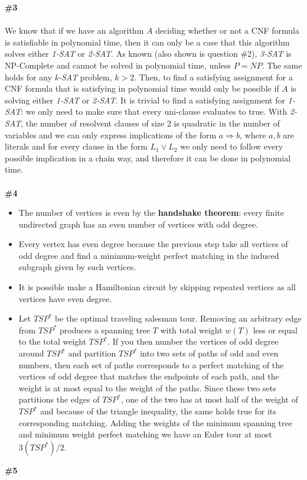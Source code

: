 \documentclass{article}
\begin{document}
\textbf{\#3}
\\
\\
We know that if we have an algorithm $A$ deciding whether or not a CNF formula is satisfiable in polynomial time, then it can only be a case that this algorithm solves either \textit{1-SAT} or \textit{2-SAT}. As known (also shown is question \#2), \textit{3-SAT} is NP-Complete and cannot be solved in polynomial time, unless $P=NP$. The same holds for any \textit{k-SAT} problem, $k > 2$. Then, to find a satisfying assignment for a CNF formula that is satisfying in polynomial time would only be possible if $A$ is solving either \textit{1-SAT} or \textit{2-SAT}. It is trivial to find a satisfying assignment for \textit{1-SAT}: we only need to make sure that every uni-clause evaluates to true. With \textit{2-SAT}, the number of resolvent clauses of size 2 is quadratic in the number of variables and we can only express implications of the form $a \Rightarrow b $, where $a, b$ are literals and for every clause in the form $L_1 \lor L_2$ we only need to follow every possible implication in a chain way, and therefore it can be done in polynomial time.
\\
\\
\textbf{\#4}
\begin{itemize}
\item The number of vertices is even by the \textbf{handshake theorem}: every finite undirected graph has an even number of vertices with odd degree.
\item Every vertex has even degree because the previous step take all vertices of odd degree and find a minimum-weight perfect matching in the induced subgraph given by such vertices.
\item It is possible make a Hamiltonian circuit by skipping repeated vertices as all vertices have even degree.
\item Let $TSP^*$ be the optimal traveling salesman tour. Removing an arbitrary edge from $TSP^*$ produces a spanning tree $T$ with total weight $w(T)$ less or equal to the total weight $TSP^*$. If you then number the vertices of odd degree around $TSP^*$ and partition $TSP^*$ into two sets of paths of odd and even numbers, then each set of paths corresponds to a perfect matching of the vertices of odd degree that matches the endpoints of each path, and the weight is at most equal to the weight of the paths. Since these two sets partitions the edges of $TSP^*$, one of the two has at most half of the weight of $TSP^*$ and because of the triangle inequality, the same holds true for its corresponding matching. Adding the weights of the minimum spanning tree and minimum weight perfect matching we have an Euler tour at most $3(TSP^*)/2$.
\end{itemize}
\textbf{\#5}
\end{document}
